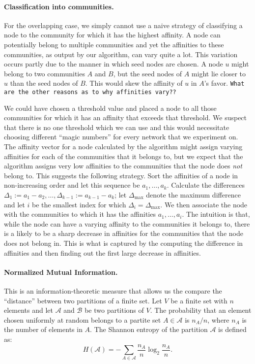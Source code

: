 \paragraph{Classification into communities.} For the overlapping case, we simply 
cannot use a naive strategy of classifying a node to the community for which it has 
the highest affinity. A node can potentially belong to multiple communities and yet 
the affinities to these communities, as output by our algorithm, can vary quite a lot. 
This variation occurs partly due to the manner in which seed nodes are chosen. A node $u$ might 
belong to two communities $A$ and $B$, but the seed nodes of $A$ might lie closer to $u$ than the 
seed nodes of $B$. This would skew the affinity of $u$ in $A$'s favor. \texttt{What are the other reasons 
as to why affinities vary??}

We could have chosen a threshold value and placed a node to all those communities for which 
it has an affinity that exceeds that threshold. We suspect that there is no one threshold 
which we can use and this would necessitate choosing different ``magic numbers'' for every network 
that we experiment on. The affinity vector for a node calculated by the 
algorithm might assign varying affinities for each of the communities that it belongs to, but we expect 
that the algorithm assigns very low affinities to the communities that the node does \emph{not} belong to. 
This suggests the following strategy. Sort the affinities of a node in non-increasing order and let this 
sequence be $a_1, \ldots, a_k$. Calculate the differences $\Delta_{1} := a_1 - a_2, \ldots, 
\Delta_{k-1} := a_{k - 1} - a_k$; let $\Delta_{\mathrm{max}}$ denote the maximum difference 
and let $i$ be the smallest index for which $\Delta_i = \Delta_{\mathrm{max}}$. We then associate 
the node with the communities to which it has the affinities $a_1, \ldots, a_i$. 
The intuition is that, while the node can have a varying affinity to the communities it belongs to, 
there is a likely to be a sharp decrease in affinities for the communities that the node does 
not belong in. This is what is captured by the computing the difference in affinities and then finding 
out the first large decrease in affinities.

\paragraph{Normalized Mutual Information.}
This is an information-theoretic measure that allows us the 
compare the ``distance'' between two partitions of a finite set. Let $V$ be a finite set 
with $n$ elements and let $\mathcal{A}$ and $\mathcal{B}$ be two partitions of $V$. The probability that an 
element chosen uniformly at random belongs to a partite set $A \in \mathcal{A}$ is $n_A/n$, where $n_A$ 
is the number of elements in $A$. The Shannon entropy of the partition $\mathcal{A}$ 
is defined as:
\begin{equation}\label{eqn:shannon_entropy}
H(\mathcal{A}) = - \sum_{A \in \mathcal{A}} \frac{n_A}{n} \log_2 \frac{n_A}{n}.
\end{equation}

